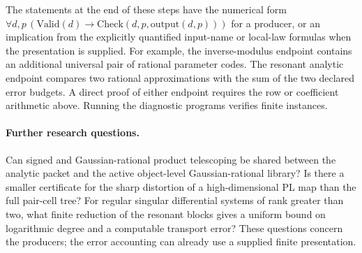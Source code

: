 The statements at the end of these steps have the numerical form
$\forall d,p\,(\mathrm{Valid}(d)\to \mathrm{Check}(d,p,\mathrm{output}(d,p)))$ for a producer, or an implication from the explicitly quantified input-name or local-law formulas when the presentation is supplied. For example, the inverse-modulus endpoint contains an additional universal pair of rational parameter codes. The resonant analytic endpoint compares two rational approximations with the sum of the two declared error budgets. A direct proof of either endpoint requires the row or coefficient arithmetic above. Running the diagnostic programs verifies finite instances.

\paragraph{Further research questions.}
Can signed and Gaussian-rational product telescoping be shared between the analytic packet and the active object-level Gaussian-rational library? Is there a smaller certificate for the sharp distortion of a high-dimensional PL map than the full pair-cell tree? For regular singular differential systems of rank greater than two, what finite reduction of the resonant blocks gives a uniform bound on logarithmic degree and a computable transport error? These questions concern the producers; the error accounting can already use a supplied finite presentation.
